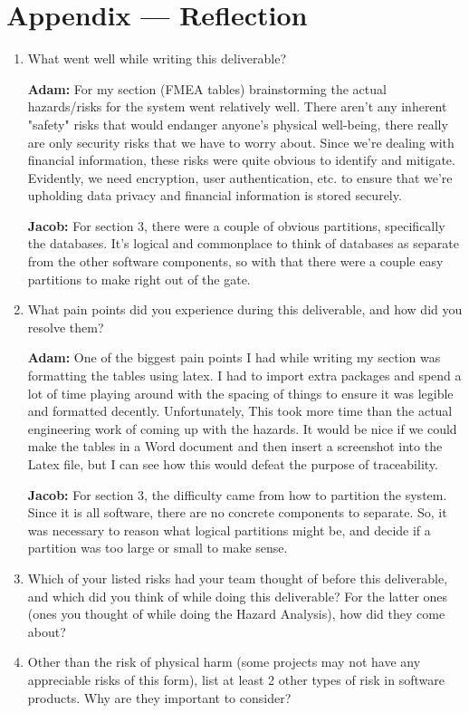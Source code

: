 \documentclass{article}
\begin{document}
\newpage{}

\section*{Appendix --- Reflection}




\begin{enumerate}
    \item What went well while writing this deliverable? 

    \textbf{Adam:} For my section (FMEA tables) brainstorming the actual hazards/risks for the system went relatively well. There aren't any inherent "safety" risks that would endanger anyone's physical well-being, there really are only security risks that we have to worry about. Since we're dealing with financial information, these risks were quite obvious to identify and mitigate. Evidently, we need encryption, user authentication, etc. to ensure that we're upholding data privacy and financial information is stored securely.

    \textbf{Jacob:} For section 3, there were a couple of obvious partitions, specifically the databases. It's logical and commonplace to think of databases as separate from the other software components, so with that there were a couple easy partitions to make right out of the gate.
    \item What pain points did you experience during this deliverable, and how
    did you resolve them?

    \textbf{Adam:} One of the biggest pain points I had while writing my section was formatting the tables using latex. I had to import extra packages and spend a lot of time playing around with the spacing of things to ensure it was legible and formatted decently. Unfortunately, This took more time than the actual engineering work of coming up with the hazards. It would be nice if we could make the tables in a Word document and then insert a screenshot into the Latex file, but I can see how this would defeat the purpose of traceability.

    \textbf{Jacob:} For section 3, the difficulty came from how to partition the system. Since it is all software, there are no concrete components to separate. So, it was necessary to reason what logical partitions might be, and decide if a partition was too large or small to make sense.

    \item Which of your listed risks had your team thought of before this
    deliverable, and which did you think of while doing this deliverable? For
    the latter ones (ones you thought of while doing the Hazard Analysis), how
    did they come about?
    \item Other than the risk of physical harm (some projects may not have any
    appreciable risks of this form), list at least 2 other types of risk in
    software products. Why are they important to consider?


\end{enumerate}
\end{document}
